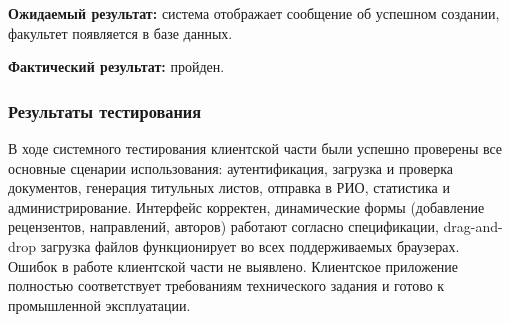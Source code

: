 \textbf{Ожидаемый результат:} система отображает сообщение об успешном создании, факультет появляется в базе данных.

\textbf{Фактический результат:} пройден.

\subsubsection{Результаты тестирования}

В ходе системного тестирования клиентской части были успешно проверены все основные сценарии использования: аутентификация, загрузка и проверка документов, генерация титульных листов, отправка в РИО, статистика и администрирование. Интерфейс корректен, динамические формы (добавление рецензентов, направлений, авторов) работают согласно спецификации, drag-and-drop загрузка файлов функционирует во всех поддерживаемых браузерах. Ошибок в работе клиентской части не выявлено. Клиентское приложение полностью соответствует требованиям технического задания и готово к промышленной эксплуатации.